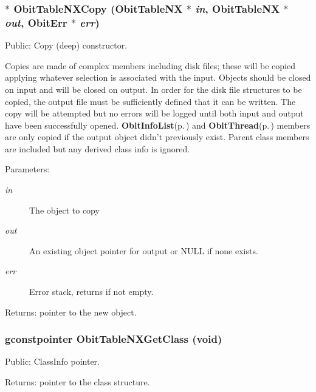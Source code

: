 \subsubsection{$\ast$ Obit\-Table\-NXCopy ({\bf Obit\-Table\-NX} $\ast$ {\em in}, {\bf Obit\-Table\-NX} $\ast$ {\em out}, {\bf Obit\-Err} $\ast$ {\em err})}\label{ObitTableNX_8c_a20}


Public: Copy (deep) constructor. 

Copies are made of complex members including disk files; these will be copied applying whatever selection is associated with the input. Objects should be closed on input and will be closed on output. In order for the disk file structures to be copied, the output file must be sufficiently defined that it can be written. The copy will be attempted but no errors will be logged until both input and output have been successfully opened. {\bf Obit\-Info\-List}{\rm (p.\,\pageref{structObitInfoList})} and {\bf Obit\-Thread}{\rm (p.\,\pageref{structObitThread})} members are only copied if the output object didn't previously exist. Parent class members are included but any derived class info is ignored. \begin{Desc}
\item[Parameters:]
\begin{description}
\item[{\em in}]The object to copy \item[{\em out}]An existing object pointer for output or NULL if none exists. \item[{\em err}]Error stack, returns if not empty. \end{description}
\end{Desc}
\begin{Desc}
\item[Returns:]pointer to the new object. \end{Desc}
\subsubsection{\setlength{\rightskip}{0pt plus 5cm}gconstpointer Obit\-Table\-NXGet\-Class (void)}\label{ObitTableNX_8c_a17}


Public: Class\-Info pointer. 

\begin{Desc}
\item[Returns:]pointer to the class structure. \end{Desc}
